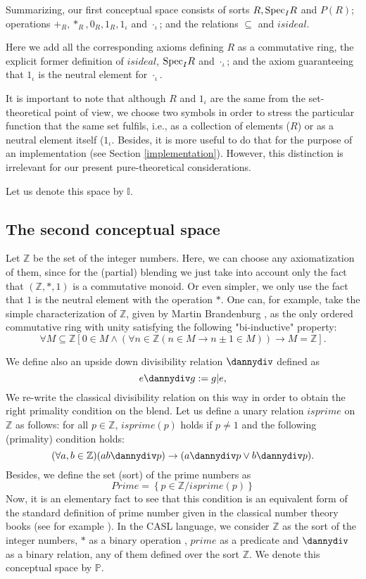 Summarizing, our first conceptual space consists of sorts $R, {\rm Spec}_IR$ and $P(R)$; operations $+_R, *_R, 0_R, 1_R, 1_{\iota}$ and $
\cdot_{\iota}$; and the relations $\subseteq$ and $isideal$.

Here we add all the corresponding axioms defining $R$ as a commutative ring, the explicit former definition of $isideal$, ${\rm Spec}_IR$ and $\cdot_{\iota}$; and the axiom guaranteeing that  $1_{\iota}$ is the neutral element for $\cdot_{\iota}$.
 
It is important to note that although $R$ and $1_{\iota}$ are the same
from the set-theoretical point of view, we choose two symbols in order
to stress the particular function that the same set fulfils, i.e., as
a collection of elements ($R$) or as a neutral element itself
($1_{\iota}$. Besides, it is more useful to do that for the purpose of
an implementation (see Section \ref{implementation}). However, this
distinction is irrelevant for our present pure-theoretical
considerations.


Let us denote this space by $\mathbb{I}$.

\subsection{The second conceptual space}
Let $\mathbb{Z}$ be the set of the integer numbers. Here, we can
choose any axiomatization of them, since for the (partial) blending we
just take into account only the fact that $(\mathbb{Z},*,1)$ is a
commutative monoid. Or even simpler, we only use the fact that $1$ is
the neutral element with the operation $*$. One can, for example, take
the simple characterization of $\mathbb{Z}$, given by Martin
Brandenburg \cite{brandenburgdobleinduction}, as the only ordered
commutative ring with unity satisfying the following "bi-inductive"
property:
\[\forall M \subseteq \mathbb{Z} \left[ 0 \in M \wedge \left(\forall n \in \mathbb{Z} \left(n\in M \rightarrow n\pm 1 \in M\right)\right) \rightarrow M=\mathbb{Z}\right].\]

We define also an upside down divisibility relation $\dannydiv$ defined as 
%
\[e\dannydiv g:=g|e,\] We re-write the classical divisibility relation
on this way in order to obtain the right primality condition on the
blend.  Let us define a unary relation $isprime$ on $\mathbb{Z}$ as
follows: for all $p\in \mathbb{Z}$, $isprime(p)$ holds if $p\neq 1$
and the following (primality) condition holds:
%
\[(\forall a,b\in \mathbb{Z})(ab \dannydiv p)\rightarrow (a \dannydiv p \vee b \dannydiv p).\] 
Besides, we define the set (sort) of the prime numbers as 
\[ Prime=\left\{ p\in \mathbb{Z}/ isprime(p)\right\}\] Now, it is an
elementary fact to see that this condition is an equivalent form of
the standard definition of prime number given in the classical number
theory books (see for example \textcite{Apostol76}). In the CASL
language, we consider $\mathbb{Z}$ as the sort of the integer numbers,
$*$ as a binary operation , $prime$ as a predicate and $\dannydiv$ as
a binary relation, any of them defined over the sort $\mathbb{Z}$.  We
denote this conceptual space by $\mathbb{P}$.

